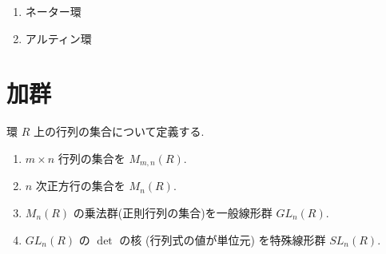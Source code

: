 \documentclass[uplatex,dvipdfmx,a4paper,11pt]{jlreq}
\theoremstyle{definition}
\begin{document}
\begin{definition}
  \begin{enumerate}
    \item ネーター環
    \item アルティン環
  \end{enumerate}
\end{definition}

\section{加群}
\begin{definition}
  環 $R$ 上の行列の集合について定義する.
  \begin{enumerate}
    \item $m\times n$ 行列の集合を $M_{m,n}(R)$.
    \item $n$ 次正方行の集合を $M_n(R)$.
    \item $M_n(R)$ の乗法群(正則行列の集合)を一般線形群 $GL_n(R)$.
    \item $GL_n(R)$ の $\det$ の核 (行列式の値が単位元) を特殊線形群 $SL_n(R)$.
  \end{enumerate}
\end{definition}
\end{document}
